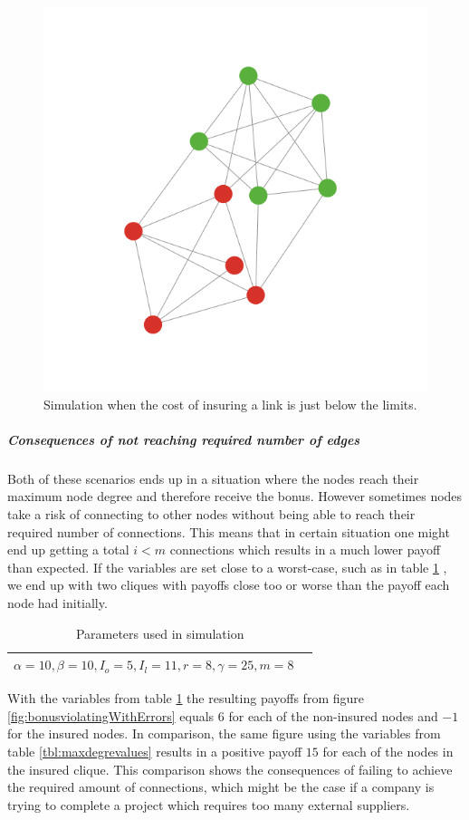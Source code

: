 \begin{figure}[h]
\centering
  \includegraphics[width=0.8\linewidth]{../Figures/BonusGameViolating.png}
  \caption{\label{fig:bonusviolating} Simulation when the cost of insuring a link is just below the limits. }
\end{figure}


\subparagraph{Consequences of not reaching required number of edges}
Both of these scenarios ends up in a situation where the nodes reach their maximum node degree and therefore receive the bonus. However sometimes nodes take a risk of connecting to other nodes without being able to reach their required number of connections. This means that in certain situation one might end up getting a total $i<m$ connections which results in a much lower payoff than expected. If the variables are set close to a worst-case, such as in table \ref{tbl:maxdegrevalueswitherror} , we end up with two cliques with payoffs close too or worse than the payoff each node had initially. 

\begin{table}[h]
\centering
\begin{tabular}{lc}
 \hline
  $\alpha=10,
  \beta=10,
  I_{o}=5,
  I_{l}=11,
  r=8,
  \gamma=25,
  m=8
  $
  \\
  \hline
\end{tabular}
\caption{Parameters used in simulation \label{tbl:maxdegrevalueswitherror}}
\end{table}

With the variables from table \ref{tbl:maxdegrevalueswitherror} the resulting payoffs from figure \ref{fig:bonusviolatingWithErrors} equals $6$ for each of the non-insured nodes and $-1$ for the insured nodes. In comparison, the same figure using the variables from table \ref{tbl:maxdegrevalues} results in a positive payoff $15$ for each of the nodes in the insured clique. This comparison shows the consequences of failing to achieve the required amount of connections, which might be the case if a company is trying to complete a project which requires too many external suppliers. 

